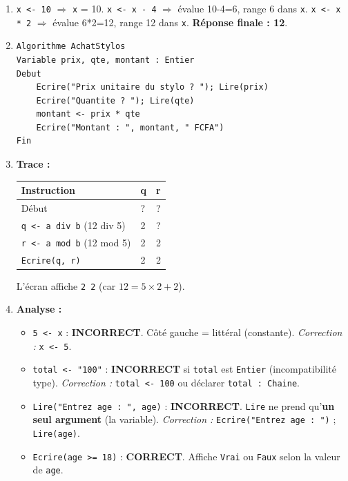 \documentclass[11pt]{article}
\begin{document}
\begin{corrige}
\begin{enumerate}
\item \texttt{x <- 10} $\Rightarrow$ \texttt{x} = 10. \quad \texttt{x <- x - 4} $\Rightarrow$ évalue 10-4=6, range 6 dans \texttt{x}. \quad \texttt{x <- x * 2} $\Rightarrow$ évalue 6*2=12, range 12 dans \texttt{x}. \textbf{Réponse finale : 12}.
\item \begin{lstlisting}
Algorithme AchatStylos
Variable prix, qte, montant : Entier
Debut
    Ecrire("Prix unitaire du stylo ? "); Lire(prix)
    Ecrire("Quantite ? "); Lire(qte)
    montant <- prix * qte
    Ecrire("Montant : ", montant, " FCFA")
Fin
\end{lstlisting}
\item \textbf{Trace :}
\begin{center}
\begin{tabularx}{0.7\linewidth}{|l|X|X|}\hline
\rowcolor{popblueL} \textbf{Instruction} & \textbf{q} & \textbf{r} \\ \hline
Début & ? & ? \\ \hline
\texttt{q <- a div b} (12 div 5) & 2 & ? \\ \hline
\texttt{r <- a mod b} (12 mod 5) & 2 & 2 \\ \hline
\texttt{Ecrire(q, r)} & 2 & 2 \\ \hline
\end{tabularx}
\end{center}
L'écran affiche \texttt{2 2} (car $12 = 5 \times 2 + 2$).
\item \textbf{Analyse :}
\begin{itemize}
\item \texttt{5 <- x} : \textbf{INCORRECT}. Côté gauche = littéral (constante). \emph{Correction :} \texttt{x <- 5}.
\item \texttt{total <- "100"} : \textbf{INCORRECT} si \texttt{total} est \texttt{Entier} (incompatibilité type). \emph{Correction :} \texttt{total <- 100} ou déclarer \texttt{total : Chaine}.
\item \texttt{Lire("Entrez age : ", age)} : \textbf{INCORRECT}. \texttt{Lire} ne prend qu'\textbf{un seul argument} (la variable). \emph{Correction :} \texttt{Ecrire("Entrez age : ")} ; \texttt{Lire(age)}.
\item \texttt{Ecrire(age >= 18)} : \textbf{CORRECT}. Affiche \texttt{Vrai} ou \texttt{Faux} selon la valeur de \texttt{age}.
\end{itemize}
\end{enumerate}
\end{corrige}
\end{document}
